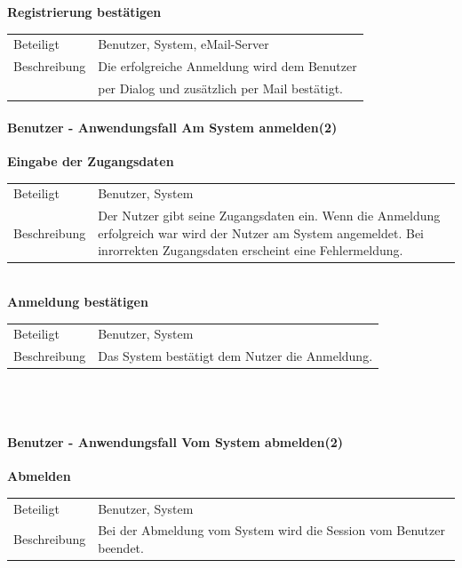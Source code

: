 \documentclass[12pt,a4paper]{article}
\begin{document}
\textbf{Registrierung bestätigen}\\
\begin{tabular}{l|p{12cm}}
	\hline 
	Beteiligt    & Benutzer, System, eMail-Server \\ 
	Beschreibung & Die erfolgreiche Anmeldung wird dem Benutzer  \\
	& per Dialog und zusätzlich per Mail bestätigt. \\ 
\end{tabular} 

\newpage
\paragraph{Benutzer - Anwendungsfall \glqq Am System anmelden\grqq (2)}\mbox{}

\textbf{Eingabe der Zugangsdaten}\\
\begin{tabular}{l|p{12cm}}
	\hline 
	Beteiligt & Benutzer, System \\ 
	Beschreibung & Der Nutzer gibt seine Zugangsdaten ein. Wenn die Anmeldung erfolgreich war wird der Nutzer am System angemeldet. Bei inrorrekten Zugangsdaten erscheint eine Fehlermeldung. \\ 
\end{tabular}\\


\textbf{Anmeldung bestätigen}\\
\begin{tabular}{l|p{12cm}}
	\hline 
	Beteiligt & Benutzer, System \\ 
	Beschreibung & Das System bestätigt dem Nutzer die Anmeldung. \\ 
\end{tabular}\\\\


\paragraph{Benutzer - Anwendungsfall \glqq Vom System abmelden\grqq (2)}\mbox{}

\textbf{Abmelden}\\
\begin{tabular}{l|p{12cm}}
	\hline 
	Beteiligt & Benutzer, System \\ 
	Beschreibung & Bei der Abmeldung vom System wird die Session vom Benutzer beendet.\\ 
\end{tabular}\\
\end{document}
